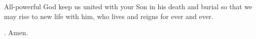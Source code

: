 \lettrine[loversize=0.15,lines=2]{A}{}ll-powerful God
keep us united with your Son
in his death and burial
so that we may rise to new life with him,
who lives and reigns for ever and ever.
\par \Rbar. Amen.

